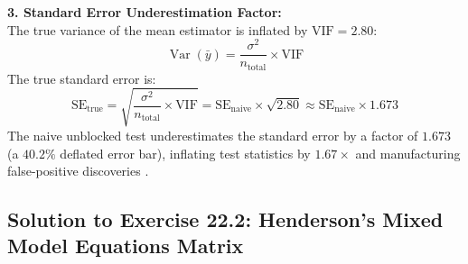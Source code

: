 \documentclass[11pt,twoside,openright]{book}
\begin{document}
\textbf{3. Standard Error Underestimation Factor:}\\
The true variance of the mean estimator is inflated by $\text{VIF} = 2.80$:
$$\operatorname{Var}(\bar{y}) = \frac{\sigma^2}{n_{\text{total}}} \times \text{VIF}$$
The true standard error is:
$$\text{SE}_{\text{true}} = \sqrt{\frac{\sigma^2}{n_{\text{total}}} \times \text{VIF}} = \text{SE}_{\text{naive}} \times \sqrt{2.80} \approx \text{SE}_{\text{naive}} \times 1.673$$
The naive unblocked test underestimates the standard error by a factor of $1.673$ (a $40.2\%$ deflated error bar), inflating test statistics by $1.67\times$ and manufacturing false-positive discoveries \cite{hurlbert1984pseudoreplication}.

\subsection*{Solution to Exercise 22.2: Henderson's Mixed Model Equations Matrix}
\end{document}
